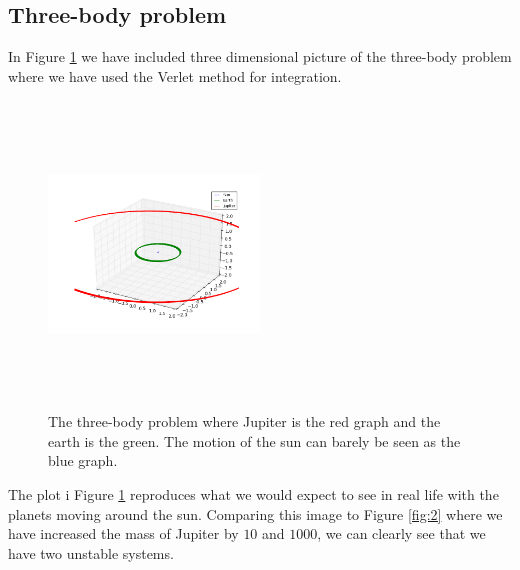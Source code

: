 \documentclass[%
 reprint,
 nobalance,
 amsmath,amssymb,
 aps,
]{revtex4-1}
\begin{document}
\subsection{\label{sec:Sub2}Three-body problem}

In Figure \ref{fig:plot/earth_sun_jupiter_mj1.png} we have included three dimensional picture of the three-body problem where we have used the Verlet method for integration.

\begin{figure}[H]
\centering
\includegraphics[height=3.2in, width=0.5\textwidth]{plot/earth_sun_jupiter_mj1.png} \caption{The three-body problem where Jupiter is the red graph and the earth is the green. The motion of the sun can barely be seen as the blue graph.}\label{fig:plot/earth_sun_jupiter_mj1.png}
\end{figure}

The plot i Figure \ref{fig:plot/earth_sun_jupiter_mj1.png} reproduces what we would expect to see in real life with the planets moving around the sun. Comparing this image to Figure \ref{fig:2} where we have increased the mass of Jupiter by $10$ and $1000$, we can clearly see that we have two unstable systems.
\end{document}
